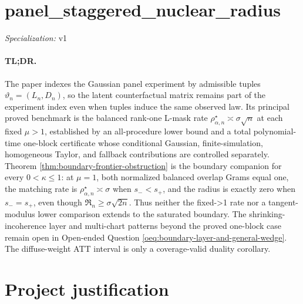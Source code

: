 \documentclass{article}
\begin{document}
\sloppy

\section*{panel\_\allowbreak{}staggered\_\allowbreak{}nuclear\_\allowbreak{}radius}

\noindent\textit{Specialization:} v1\par

\paragraph{TL;DR.} The paper indexes the Gaussian panel experiment by admissible tuples \(\vartheta_n=(L_n,D_n)\), so the latent counterfactual matrix remains part of the experiment index even when tuples induce the same observed law. Its principal proved benchmark is the balanced rank-one L-mask rate \(\rho_{\alpha,n}^{\star}\asymp\sigma\sqrt n\) at each fixed \(\mu>1\), established by an all-procedure lower bound and a total polynomial-time one-block certificate whose conditional Gaussian, finite-simulation, homogeneous Taylor, and fallback contributions are controlled separately. Theorem \ref{thm:boundary-frontier-obstruction} is the boundary companion for every \(0<\kappa\le1\): at \(\mu=1\), both normalized balanced overlap Grams equal one, the matching rate is \(\rho_{\alpha,n}^{\star}\asymp\sigma\) when \(s_-<s_+\), and the radius is exactly zero when \(s_-=s_+\), even though \(\mathfrak R_n\ge\sigma\sqrt{2n}\). Thus neither the fixed-\mu>1 rate nor a tangent-modulus lower comparison extends to the saturated boundary. The shrinking-incoherence layer and multi-chart patterns beyond the proved one-block case remain open in Open-ended Question \ref{oeq:boundary-layer-and-general-wedge}. The diffuse-weight ATT interval is only a coverage-valid duality corollary.

\section{Project justification}
\end{document}
